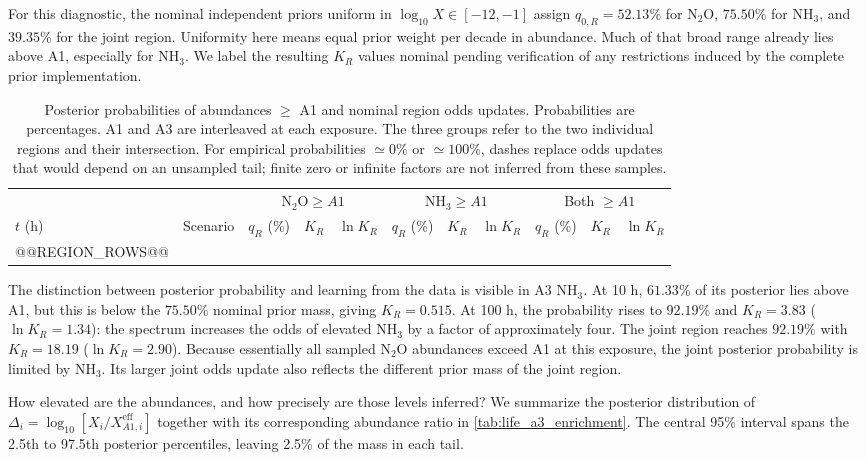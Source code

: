 For this diagnostic, the nominal independent priors uniform in $\log_{10}X\in[-12,-1]$ assign $q_{0,R}=52.13\%$ for $\mathrm{N_2O}$, $75.50\%$ for $\mathrm{NH_3}$, and $39.35\%$ for the joint region. Uniformity here means equal prior weight per decade in abundance. Much of that broad range already lies above A1, especially for $\mathrm{NH_3}$. We label the resulting $K_R$ values nominal pending verification of any restrictions induced by the complete prior implementation.

\begin{table}[t!]
\centering
\caption{Posterior probabilities of abundances $\geq$ A1 and nominal region odds updates. Probabilities are percentages. A1 and A3 are interleaved at each exposure. The three groups refer to the two individual regions and their intersection. For empirical probabilities $\simeq0\%$ or $\simeq100\%$, dashes replace odds updates that would depend on an unsampled tail; finite zero or infinite factors are not inferred from these samples.}
\label{tab:life_a1_regions}
\begingroup
\scriptsize
\setlength{\tabcolsep}{3pt}
\begin{tabular}{llrrrrrrrrr}
\hline
 & & \multicolumn{3}{c}{$\mathrm{N_2O}\geq A1$} & \multicolumn{3}{c}{$\mathrm{NH_3}\geq A1$} & \multicolumn{3}{c}{Both $\geq A1$} \\
$t$ (h) & Scenario & $q_R$ (\%) & $K_R$ & $\ln K_R$ & $q_R$ (\%) & $K_R$ & $\ln K_R$ & $q_R$ (\%) & $K_R$ & $\ln K_R$ \\
\hline
@@REGION_ROWS@@
\hline
\end{tabular}
\endgroup
\end{table}

The distinction between posterior probability and learning from the data is visible in A3 $\mathrm{NH_3}$. At 10 h, $61.33\%$ of its posterior lies above A1, but this is below the $75.50\%$ nominal prior mass, giving $K_R=0.515$. At 100 h, the probability rises to $92.19\%$ and $K_R=3.83$ ($\ln K_R=1.34$): the spectrum increases the odds of elevated $\mathrm{NH_3}$ by a factor of approximately four. The joint region reaches $92.19\%$ with $K_R=18.19$ ($\ln K_R=2.90$). Because essentially all sampled $\mathrm{N_2O}$ abundances exceed A1 at this exposure, the joint posterior probability is limited by $\mathrm{NH_3}$. Its larger joint odds update also reflects the different prior mass of the joint region.

How elevated are the abundances, and how precisely are those levels inferred? We summarize the posterior distribution of $\Delta_i=\log_{10}[X_i/X^{\mathrm{eff}}_{A1,i}]$ together with its corresponding abundance ratio in \autoref{tab:life_a3_enrichment}. The central 95\% interval spans the 2.5th to 97.5th posterior percentiles, leaving 2.5\% of the mass in each tail.


